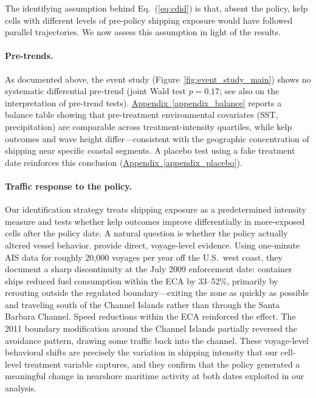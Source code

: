 \documentclass[12pt]{article}
\begin{document}
The identifying assumption behind Eq.~(\ref{eq:cdid}) is that, absent the policy, kelp cells with different levels of pre-policy shipping exposure would have followed parallel trajectories. We now assess this assumption in light of the results.

\paragraph{Pre-trends.} As documented above, the event study (Figure~\ref{fig:event_study_main}) shows no systematic differential pre-trend (joint Wald test $p=0.17$; see also \citealp{RambachanRoth2023} on the interpretation of pre-trend tests). \hyperref[appendix_balance]{Appendix~\ref*{appendix_balance}} reports a balance table showing that pre-treatment environmental covariates (SST, precipitation) are comparable across treatment-intensity quartiles, while kelp outcomes and wave height differ---consistent with the geographic concentration of shipping near specific coastal segments. A placebo test using a fake treatment date reinforces this conclusion (\hyperref[appendix_placebo]{Appendix~\ref*{appendix_placebo}}).

\paragraph{Traffic response to the policy.} Our identification strategy treats shipping exposure as a predetermined intensity measure and tests whether kelp outcomes improve differentially in more-exposed cells after the policy date. A natural question is whether the policy actually altered vessel behavior. \citet{Klotz2022} provide direct, voyage-level evidence. Using one-minute AIS data for roughly 20,000 voyages per year off the U.S.\ west coast, they document a sharp discontinuity at the July 2009 enforcement date: container ships reduced fuel consumption within the ECA by 33--52\%, primarily by rerouting outside the regulated boundary---exiting the zone as quickly as possible and traveling south of the Channel Islands rather than through the Santa Barbara Channel. Speed reductions within the ECA reinforced the effect. The 2011 boundary modification around the Channel Islands partially reversed the avoidance pattern, drawing some traffic back into the channel. These voyage-level behavioral shifts are precisely the variation in shipping intensity that our cell-level treatment variable captures, and they confirm that the policy generated a meaningful change in nearshore maritime activity at both dates exploited in our analysis.
\end{document}
